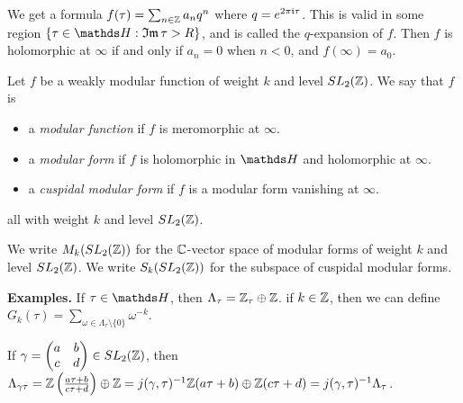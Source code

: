 \documentclass[10pt,a4paper]{article}
\begin{document}
We get a formula $f(\tau) = \sum_{n\in \mathbb{Z}}a_nq^n$ where $q = e^{2\pi\mathfrak{i}\tau}$. This is valid in some region $\{\tau \in \H : \Im \tau > R\}$, and is called the $q$-expansion of $f$. Then $f$ is holomorphic at $\infty$ if and only if $a_n = 0$ when $n < 0$, and $f(\infty) = a_0$.
\begin{definition}
  Let $f$ be a weakly modular function of weight $k$ and level $SL_2(\mathbb{Z})$. We say that $f$ is
  \begin{itemize}
    \item a \emph{modular function} if $f$ is meromorphic at $\infty$.
    \item a \emph{modular form} if $f$ is holomorphic in $\H$ and holomorphic at $\infty$.
    \item a \emph{cuspidal modular form} if $f$ is a modular form vanishing at $\infty$.
  \end{itemize}
  all with weight $k$ and level $SL_2(\mathbb{Z})$.

  We write $M_k(SL_2(\mathbb{Z}))$ for the $\mathbb{C}$-vector space of modular forms of weight $k$ and level $SL_2(\mathbb{Z})$. We write $S_k(SL_2(\mathbb{Z}))$ for the subspace of cuspidal modular forms.
\end{definition}
\textbf{Examples.} If $\tau \in \H$, then $\Lambda_\tau = \mathbb{Z}_\tau \oplus \mathbb{Z}$. if $k \in \mathbb{Z}$, then we can define $G_k(\tau) = \sum\limits_{\omega \in \Lambda_\tau\setminus\{0\}}\omega^{-k}$.

If $\gamma = \begin{pmatrix}a&b\\c&d\end{pmatrix} \in SL_2(\mathbb{Z})$, then $\Lambda_{\gamma \tau} = \mathbb{Z}\left(\frac{a\tau+b}{c\tau+d}\right)\oplus \mathbb{Z} = j(\gamma,\tau)^{-1}\mathbb{Z}(a\tau+b)\oplus \mathbb{Z}(c\tau+d) = j(\gamma,\tau)^{-1}\Lambda_\tau$.
\end{document}
